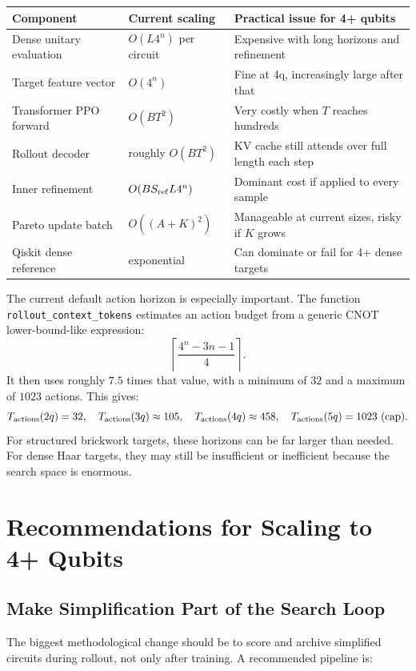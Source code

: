 \documentclass[11pt]{article}
\begin{document}
\begin{table}[h]
\centering
\begin{tabular}{@{}lll@{}}
\toprule
Component & Current scaling & Practical issue for 4+ qubits \\
\midrule
Dense unitary evaluation & \(O(L4^n)\) per circuit & Expensive with long horizons and refinement \\
Target feature vector & \(O(4^n)\) & Fine at 4q, increasingly large after that \\
Transformer PPO forward & \(O(BT^2)\) & Very costly when \(T\) reaches hundreds \\
Rollout decoder & roughly \(O(BT^2)\) & KV cache still attends over full length each step \\
Inner refinement & \(O(BS_{\rm ref}L4^n)\) & Dominant cost if applied to every sample \\
Pareto update batch & \(O((A+K)^2)\) & Manageable at current sizes, risky if \(K\) grows \\
Qiskit dense reference & exponential & Can dominate or fail for 4+ dense targets \\
\bottomrule
\end{tabular}
\end{table}

The current default action horizon is especially important.  The function
\texttt{rollout\_context\_tokens} estimates an action budget from a generic CNOT
lower-bound-like expression:
\[
  \left\lceil \frac{4^n - 3n - 1}{4} \right\rceil.
\]
It then uses roughly \(7.5\) times that value, with a minimum of \(32\) and a
maximum of \(1023\) actions.  This gives:
\[
  T_{\rm actions}(2q)=32,\quad
  T_{\rm actions}(3q)\approx105,\quad
  T_{\rm actions}(4q)\approx458,\quad
  T_{\rm actions}(5q)=1023 \text{ (cap)}.
\]
For structured brickwork targets, these horizons can be far larger than needed.
For dense Haar targets, they may still be insufficient or inefficient because the
search space is enormous.

\section{Recommendations for Scaling to 4+ Qubits}

\subsection{Make Simplification Part of the Search Loop}

The biggest methodological change should be to score and archive simplified
circuits during rollout, not only after training.  A recommended pipeline is:
\end{document}

